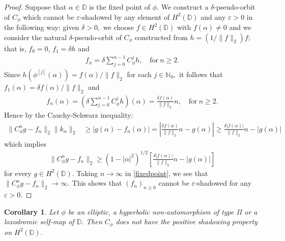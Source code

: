 \documentclass[11pt]{amsart}
\theoremstyle{plain}
\newtheorem{corollary}[definition]{Corollary}
\theoremstyle{remark}
\theoremstyle{plain}
\begin{document}
\begin{proof} Suppose that $\alpha\in \mathbb{D}$ is the fixed point of $\phi.$ We construct a $\delta$-pseudo-orbit of $C_{\phi}$ which cannot be $\varepsilon$-shadowed by any element of $H^2(\mathbb{D})$ and any $\varepsilon>0$ in the following way: given $\delta>0,$ we choose $f\in H^2(\mathbb{D})$ with $f(\alpha)\neq 0$ and we consider the natural  $\delta$-pseudo-orbit of $C_{\phi}$ constructed from  $h = (1/\|f\|_2)f;$ that is, $f_0 = 0$, $f_1=\delta h$ and 
\begin{align*}
f_n=\delta\sum_{j=0}^{n-1}C_{\phi}^{j}h, \quad \text{for}\ n\geq2.
\end{align*}
Since $h(\phi^{[j]}(\alpha)) =f(\alpha)/\|f\|_2$ for each $j\in \mathbb{N}_0,$ it follows that $f_1(\alpha)=\delta f(\alpha)/\|f\|_2$ and 
\begin{align*}
f_n(\alpha)= \left( \delta \sum_{j=0}^{n-1}C_{\phi}^{j}h \right)(\alpha)=\frac{\delta f(\alpha)}{\|f\|_2}n, \quad \text{for}\ n\geq2.
\end{align*}
Hence by the Cauchy-Schwarz inequality:
\begin{align*}
\|C_{\phi}^ng-f_n\|_2\|k_{\alpha}\|_2& \geq 
|g(\alpha)-f_n(\alpha)|= \left| \frac{\delta f(\alpha)}{\|f\|_2}n-g(\alpha) \right| \geq \frac{\delta |f(\alpha)|}{\|f\|_2}n-|g(\alpha)|
\end{align*}
which implies
\begin{align}\label{fixedpoint}
\|C_{\phi}^ng-f_n\|_2\geq (1-|\alpha|^2)^{1/2}\left[  \frac{\delta |f(\alpha)|}{\|f\|_2}n-|g(\alpha)|\right]
\end{align}
for every $g\in H^2(\mathbb{D}).$ Taking $n\to \infty$ in \eqref{fixedpoint}, we see that $\|C_{\phi}^ng-f_n\|_2\to \infty.$ This shows that $(f_n)_{n\geq 0}$ cannot be $\varepsilon$-shadowed for any $\varepsilon>0.$
\end{proof}

\begin{corollary}\label{elliptic-loxodormic-hyperbolic non-automorphism of type II} Let $\phi$ be an elliptic, a hyperbolic non-automorphism of type II or a loxodromic self-map of $\mathbb{D}.$ Then $C_{\phi}$ does not have the positive shadowing property on $H^{2}(\mathbb{D}).$ 
\end{corollary}
\end{document}
